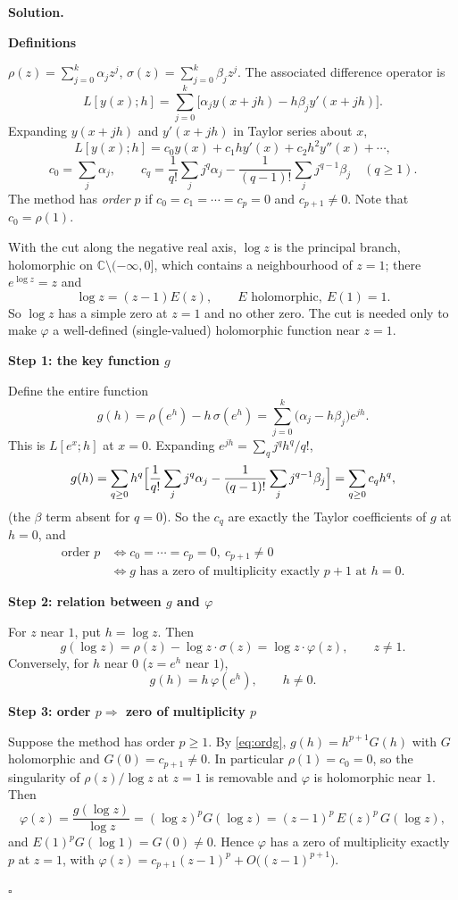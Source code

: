 \documentclass[11pt,a4paper]{article}
\newenvironment{solution}
  {\par\noindent\textbf{Solution.}\par\nobreak}
  {\par\hfill\(\square\)\par}
\newcommand{\step}[1]{\par\addvspace{0.5em}\noindent\textbf{#1}\par\nobreak}
\begin{document}
\begin{solution}
\step{Definitions}
\(\rho(z)=\sum_{j=0}^k\alpha_jz^j\), \(\sigma(z)=\sum_{j=0}^k\beta_jz^j\).
The associated difference operator is
\[
  L[y(x);h]=\sum_{j=0}^k\bigl[\alpha_jy(x+jh)-h\beta_jy'(x+jh)\bigr].
\]
Expanding \(y(x+jh)\) and \(y'(x+jh)\) in Taylor series about \(x\),
\[
  L[y(x);h]=c_0y(x)+c_1hy'(x)+c_2h^2y''(x)+\cdots,
\]
\[
  c_0=\sum_j\alpha_j,\qquad
  c_q=\frac1{q!}\sum_jj^q\alpha_j-\frac1{(q-1)!}\sum_jj^{q-1}\beta_j\quad(q\ge1).
\]
The method has \emph{order \(p\)} if \(c_0=c_1=\cdots=c_p=0\) and
\(c_{p+1}\ne0\).  Note that \(c_0=\rho(1)\).

With the cut along the negative real axis, \(\log z\) is the principal
branch, holomorphic on \(\mathbb C\setminus(-\infty,0]\), which
contains a neighbourhood of \(z=1\); there \(e^{\log z}=z\) and
\[
  \log z=(z-1)E(z),\qquad E \text{ holomorphic},\ E(1)=1 .
\]
So \(\log z\) has a simple zero at \(z=1\) and no other zero.  The
cut is needed only to make \(\varphi\) a well-defined (single-valued)
holomorphic function near \(z=1\).

\step{Step 1: the key function \(g\)}
Define the entire function
\[
  g(h)=\rho(e^h)-h\,\sigma(e^h)=\sum_{j=0}^k\bigl(\alpha_j-h\beta_j\bigr)e^{jh}.
\]
This is \(L[e^x;h]\) at \(x=0\).  Expanding
\(e^{jh}=\sum_q j^qh^q/q!\),
\[
  g(h)=\sum_{q\ge0}h^q\Bigl[\frac1{q!}\sum_jj^q\alpha_j
       -\frac1{(q-1)!}\sum_jj^{q-1}\beta_j\Bigr]
  =\sum_{q\ge0}c_qh^q,
\]
(the \(\beta\) term absent for \(q=0\)).  So the \(c_q\) are exactly
the Taylor coefficients of \(g\) at \(h=0\), and
\begin{equation}\label{eq:ordg}
\begin{aligned}
  \text{order }p&\iff c_0=\cdots=c_p=0,\ c_{p+1}\ne0\\
  &\iff g\text{ has a zero of multiplicity exactly }p+1\text{ at }h=0 .
\end{aligned}
\end{equation}

\step{Step 2: relation between \(g\) and \(\varphi\)}
For \(z\) near \(1\), put \(h=\log z\).  Then
\[
  g(\log z)=\rho(z)-\log z\cdot\sigma(z)=\log z\cdot\varphi(z),
  \qquad z\ne1 .
\]
Conversely, for \(h\) near \(0\) (\(z=e^h\) near \(1\)),
\begin{equation}\label{eq:gphi}
  g(h)=h\,\varphi(e^h),\qquad h\ne0 .
\end{equation}

\step{Step 3: order \(p\Rightarrow\) zero of multiplicity \(p\)}
Suppose the method has order \(p\ge1\).  By \eqref{eq:ordg},
\(g(h)=h^{p+1}G(h)\) with \(G\) holomorphic and \(G(0)=c_{p+1}\ne0\).
In particular \(\rho(1)=c_0=0\), so the singularity of
\(\rho(z)/\log z\) at \(z=1\) is removable and \(\varphi\) is
holomorphic near \(1\).  Then
\[
  \varphi(z)=\frac{g(\log z)}{\log z}
  =(\log z)^pG(\log z)=(z-1)^p\,E(z)^p\,G(\log z),
\]
and \(E(1)^pG(\log1)=G(0)\ne0\).  Hence \(\varphi\) has a zero of
multiplicity exactly \(p\) at \(z=1\), with
\(\varphi(z)=c_{p+1}(z-1)^p+O\bigl((z-1)^{p+1}\bigr)\).


\end{solution}
\end{document}
